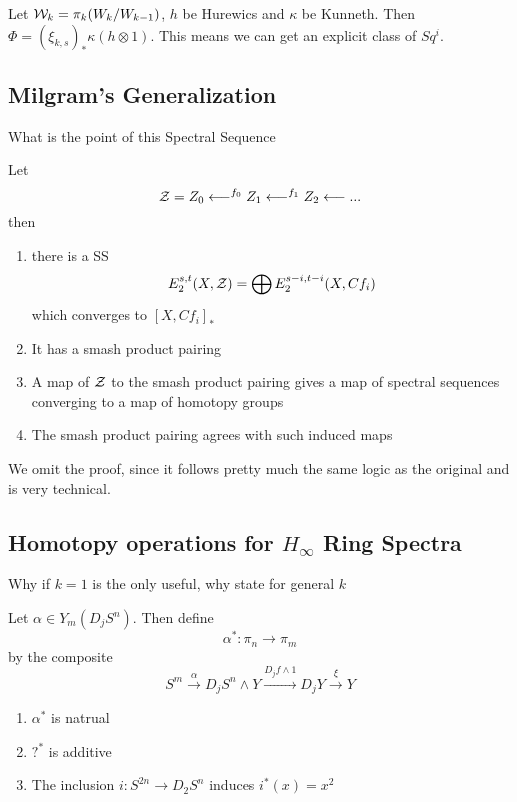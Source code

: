 Let $\mathcal{W}_k=\pi_k(W_k/W_{k-1})$, $h$ be Hurewics and $\kappa$ be Kunneth.  
Then $\Phi=(\xi_{k,s})_*\kappa(h\otimes 1)$.   This means we can get an explicit class of $Sq^i$.   

\subsection{Milgram's Generalization}

\begin{Unknown}
  What is the point of this Spectral Sequence
\end{Unknown}

\begin{Theorem}
  Let 
  \[\mathcal{Z}=Z_0\longleftarrow^{f_0} Z_1\longleftarrow^{f_1} Z_2\longleftarrow ...\]
  then
  \begin{enumerate}
    \item there is a SS 
      \[E_2^{s,t}(X,\mathcal{Z})=\bigoplus E_2^{s-i,t-i}(X,Cf_i)\]
      which converges to $[X,Cf_i]_*$
    \item It has a smash product pairing
    \item A map of $\mathcal{Z}$ to the smash product pairing gives a map of spectral sequences converging to a map of homotopy groups
    \item The smash product pairing agrees with such induced maps
  \end{enumerate}
\end{Theorem}

We omit the proof, since it follows pretty much the same logic as the original and is very technical.  

\subsection{Homotopy operations for $H_\infty$ Ring Spectra}

\begin{Unknown}
  Why if $k=1$ is the only useful, why state for general $k$
\end{Unknown}

\begin{Def}
  Let $\alpha\in Y_m(D_jS^n)$.  Then define 
  \[\alpha^*:\pi_n\to \pi_m\]
  by the composite 
  \[S^m\xrightarrow{\alpha} D_jS^n\wedge Y\xrightarrow{D_jf\wedge 1} D_jY\xrightarrow{\xi} Y\]
\end{Def}

\begin{Lemma}
  \begin{enumerate}
    \item $\alpha^*$ is natrual
    \item $?^*$ is additive
    \item The inclusion $i:S^{2n}\to D_2S^n$ induces $i^*(x)=x^2$
  \end{enumerate}
\end{Lemma}

